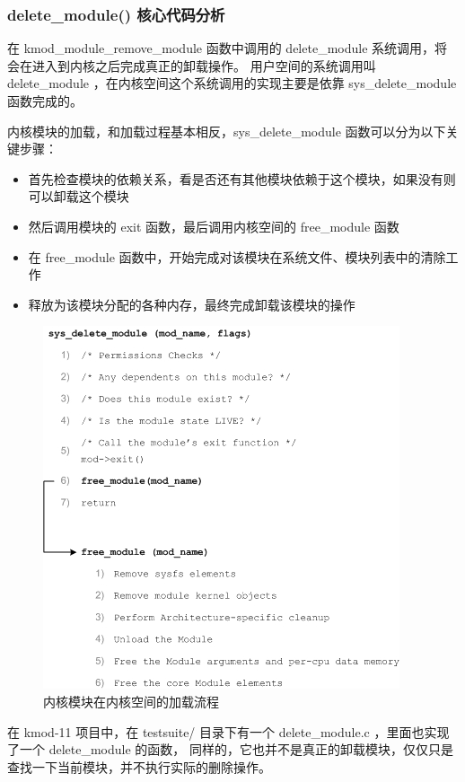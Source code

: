 \documentclass[11pt,a4paper]{article}
\makeatletter
\def\maxwidth{\ifdim\Gin@nat@width>\linewidth\linewidth
\else\Gin@nat@width\fi}
\let\Oldincludegraphics\includegraphics
\renewcommand{\includegraphics}[1]{\Oldincludegraphics[width=\maxwidth]{#1}}
\makeatother
\begin{document}
\subsubsection{delete\_module() 核心代码分析}

在 kmod\_module\_remove\_module 函数中调用的 delete\_module
系统调用，将会在进入到内核之后完成真正的卸载操作。 用户空间的系统调用叫
delete\_module ，在内核空间这个系统调用的实现主要是依靠
sys\_delete\_module 函数完成的。

内核模块的加载，和加载过程基本相反，sys\_delete\_module
函数可以分为以下关键步骤：

\begin{itemize}
\item
  首先检查模块的依赖关系，看是否还有其他模块依赖于这个模块，如果没有则可以卸载这个模块
\item
  然后调用模块的 exit 函数，最后调用内核空间的 free\_module 函数
\item
  在 free\_module
  函数中，开始完成对该模块在系统文件、模块列表中的清除工作
\item
  释放为该模块分配的各种内存，最终完成卸载该模块的操作
\end{itemize}
\begin{figure}[htbp]
\centering
\includegraphics{./figures/sys_delete_module.jpg}
\caption{内核模块在内核空间的加载流程}
\end{figure}

在 kmod-11 项目中，在 testsuite/ 目录下有一个 delete\_module.c
，里面也实现了一个 delete\_module 的函数，
同样的，它也并不是真正的卸载模块，仅仅只是查找一下当前模块，并不执行实际的删除操作。
\end{document}

